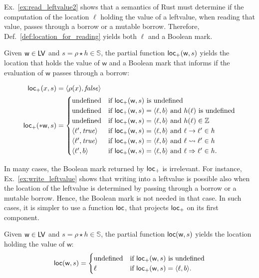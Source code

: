 Ex.~\ref{ex:read_leftvalue2} shows that a semantics of Rust must determine
if the computation of the location $\ell$ holding the value of a leftvalue, when reading that value,
passes through a borrow or a mutable borrow. Therefore, Def.~\ref{def:location_for_reading}
yields both $\ell$ and a Boolean mark.

\begin{definition}\label{def:location_for_reading}
  Given $\mathsf{w}\in\mathsf{LV}$ and $s=\rho\star h\in\mathbb{S}$, the
  partial function $\mathsf{loc_+}(\mathsf{w},s)$ yields the location that holds
  the value of $\mathsf{w}$ and a Boolean mark that informs if the evaluation
  of $\mathsf{w}$ passes through a borrow:

  \begin{align*}
    \mathsf{loc_+}(x,s) &= \langle\rho(x),\mathit{false}\rangle\\
    \mathsf{loc_+}(*\mathsf{w},s) &= \begin{cases}
      \text{undefined} & \text{if $\mathsf{loc_+}(\mathsf{w},s)$ is undefined}\\
      \text{undefined} & \text{if $\mathsf{loc_+}(\mathsf{w},s)=\langle\ell,b\rangle$ and $h(\ell)$ is undefined}\\
      \text{undefined} & \text{if $\mathsf{loc_+}(\mathsf{w},s)=\langle\ell,b\rangle$ and $h(\ell)\in\mathbb{Z}$}\\
      \langle \ell',\mathit{true}\rangle & \text{if $\mathsf{loc_+}(\mathsf{w},s)=\langle\ell,b\rangle$ and $\ell\to\ell'\in h$}\\
      \langle \ell',\mathit{true}\rangle & \text{if $\mathsf{loc_+}(\mathsf{w},s)=\langle\ell,b\rangle$ and $\ell\leadsto\ell'\in h$}\\
      \langle \ell',b\rangle & \text{if $\mathsf{loc_+}(\mathsf{w},s)=\langle\ell,b\rangle$ and $\ell\Rightarrow\ell'\in h$.}
    \end{cases}
  \end{align*}
\end{definition}

\noindent
In many cases, the Boolean mark returned by $\mathsf{loc_+}$ is irrelevant. For instance,
Ex.~\ref{ex:write_leftvalue} shows that writing into a leftvalue is possible also when
the location of the leftvalue is determined by passing through a borrow or a mutable borrow.
Hence, the Boolean mark is not needed in that case. In such cases, it is simpler
to use a function $\mathsf{loc}$, that projects $\mathsf{loc_+}$ on its first component.

\begin{definition}[Location]\label{def:location}
  Given $\mathsf{w}\in\mathsf{LV}$ and $s=\rho\star h\in\mathbb{S}$, the
  partial function $\mathsf{loc}(\mathsf{w},s)$ yields the location holding the value of $\mathsf{w}$:
  \[
    \mathsf{loc}(\mathsf{w},s) = \begin{cases}
      \text{undefined} & \text{if $\mathsf{loc_+}(\mathsf{w},s)$ is undefined}\\
      \ell & \text{if $\mathsf{loc_+}(\mathsf{w},s)=\langle\ell,b\rangle$.}
    \end{cases}
  \]
\end{definition}

